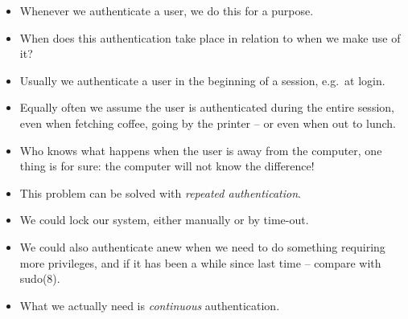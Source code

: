 \begin{frame}
  \begin{exercise}
    \begin{itemize}
      \item Whenever we authenticate a user, we do this for a purpose.

      \item When does this authentication take place in relation to when we make 
        use of it?
    \end{itemize}
  \end{exercise}
\end{frame}

\begin{frame}
  \begin{example}
    \begin{itemize}
      \item Usually we authenticate a user in the beginning of a session, e.g.\ 
        at login.

      \item Equally often we assume the user is authenticated during the entire 
        session, even when fetching coffee, going by the printer -- or even when 
        out to lunch.

      \item Who knows what happens when the user is away from the computer, one 
        thing is for sure: the computer will not know the difference!

    \end{itemize}
  \end{example}
\end{frame}

\begin{frame}
  \begin{solution}
    \begin{itemize}
      \item This problem can be solved with \emph{repeated authentication}.

      \item We could lock our system, either manually or by time-out.

      \item We could also authenticate anew when we need to do something 
        requiring more privileges, and if it has been a while since last time -- 
        compare with sudo(8).
    \end{itemize}
  \end{solution}

  \pause{}

  \begin{remark}
    \begin{itemize}
      \item What we actually need is \emph{continuous} authentication.
    \end{itemize}
  \end{remark}
\end{frame}

